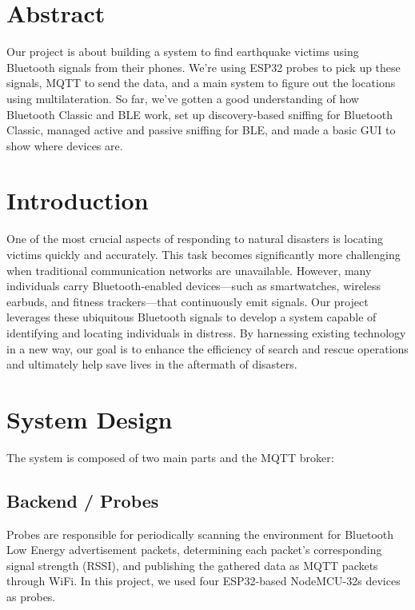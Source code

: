 \documentclass[11pt]{article}
\begin{document}
\tableofcontents
\newpage

\section{Abstract}

Our project is about building a system to find earthquake victims using Bluetooth signals from their phones. We're using ESP32 probes to pick up these signals, MQTT to send the data, and a main system to figure out the locations using multilateration. So far, we've gotten a good understanding of how Bluetooth Classic and BLE work, set up discovery-based sniffing for Bluetooth Classic, managed active and passive sniffing for BLE, and made a basic GUI to show where devices are.


\section{Introduction}

One of the most crucial aspects of responding to natural disasters is locating victims quickly and accurately. This task becomes significantly more challenging when traditional communication networks are unavailable. However, many individuals carry Bluetooth-enabled devices—such as smartwatches, wireless earbuds, and fitness trackers—that continuously emit signals. Our project leverages these ubiquitous Bluetooth signals to develop a system capable of identifying and locating individuals in distress. By harnessing existing technology in a new way, our goal is to enhance the efficiency of search and rescue operations and ultimately help save lives in the aftermath of disasters.

\section{System Design}

The system is composed of two main parts and the MQTT broker:

\subsection{Backend / Probes}

Probes are responsible for periodically scanning the environment for Bluetooth Low Energy advertisement packets, determining each packet's corresponding signal strength (RSSI), and publishing the gathered data as MQTT packets through WiFi. In this project, we used four ESP32-based NodeMCU-32s devices as probes.
\end{document}
